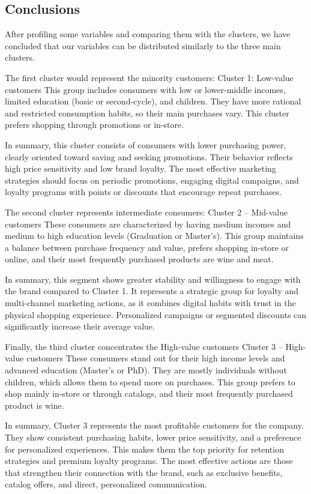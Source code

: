 \newpage
\subsection{Conclusions}
After profiling some variables and comparing them with the clusters, we have concluded that our variables can be distributed similarly to the three main clusters.

The first cluster would represent the minority customers:
Cluster 1: Low-value customers
This group includes consumers with low or lower-middle incomes, limited education (basic or second-cycle), and children. They have more rational and restricted consumption habits, so their main purchases vary. This cluster prefers shopping through promotions or in-store.

In summary, this cluster consists of consumers with lower purchasing power, clearly oriented toward saving and seeking promotions. Their behavior reflects high price sensitivity and low brand loyalty. The most effective marketing strategies should focus on periodic promotions, engaging digital campaigns, and loyalty programs with points or discounts that encourage repeat purchases.

The second cluster represents intermediate consumers:
Cluster 2 – Mid-value customers
These consumers are characterized by having medium incomes and medium to high education levels (Graduation or Master’s). This group maintains a balance between purchase frequency and value, prefers shopping in-store or online, and their most frequently purchased products are wine and meat.

In summary, this segment shows greater stability and willingness to engage with the brand compared to Cluster 1. It represents a strategic group for loyalty and multi-channel marketing actions, as it combines digital habits with trust in the physical shopping experience. Personalized campaigns or segmented discounts can significantly increase their average value.

Finally, the third cluster concentrates the High-value customers
Cluster 3 – High-value customers
These consumers stand out for their high income levels and advanced education (Master’s or PhD). They are mostly individuals without children, which allows them to spend more on purchases. This group prefers to shop mainly in-store or through catalogs, and their most frequently purchased product is wine.

In summary, Cluster 3 represents the most profitable customers for the company. They show consistent purchasing habits, lower price sensitivity, and a preference for personalized experiences. This makes them the top priority for retention strategies and premium loyalty programs. The most effective actions are those that strengthen their connection with the brand, such as exclusive benefits, catalog offers, and direct, personalized communication.

